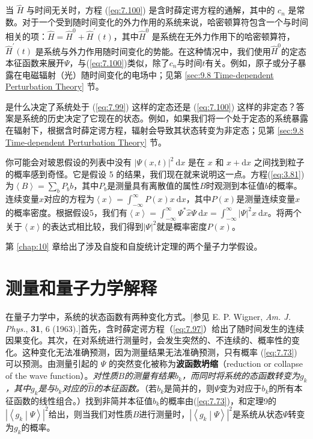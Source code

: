     当 $\hat{H}$ 与时间无关时，方程 (\ref{eq:7.100}) 是含时薛定谔方程的通解，其中的 $c_n$ 是常数。对于一个受到随时间变化的外力作用的系统来说，哈密顿算符包含一个与时间相关的项：$\hat{H} = \hat{H}^0 + \hat{H}^{\prime}\left(t\right)$，其中$\hat{H}^0$ 是系统在无外力作用下的哈密顿算符，$\hat{H}^{\prime}\left(t\right)$ 是系统与外力作用随时间变化的势能。在这种情况中，我们使用$\hat{H}^0$的定态本征函数来展开$\Psi$，与(\ref{eq:7.100})类似，除了$c_n$与时间$t$有关。例如，原子或分子暴露在电磁辐射（光）随时间变化的电场中；见第 \ref{sec:9.8 Time-dependent Perturbation Theory} 节。

    是什么决定了系统处于 (\ref{eq:7.99}) 这样的定态还是 (\ref{eq:7.100}) 这样的非定态？答案是系统的历史决定了它现在的状态。例如，如果我们将一个处于定态的系统暴露在辐射下，根据含时薛定谔方程，辐射会导致其状态转变为非定态；见第 \ref{sec:9.8 Time-dependent Perturbation Theory} 节。

    你可能会对玻恩假设的列表中没有 $\left|\Psi\left(x,t\right)\right|^2\:\mathrm{d}x$ 是在 $x$ 和 $x+\mathrm{d}x$ 之间找到粒子的概率感到奇怪。它是假设 5 的结果，我们现在就来说明这一点。方程(\ref{eq:3.81})为$\left\langle B \right\rangle = \sum_{b}P_bb$，其中$P_b$是测量具有离散值的属性$B$时观测到本征值$b$的概率。连续变量$x$对应的方程为$\left\langle x \right\rangle = \int_{-\infty}^{\infty}P\left(x\right)x\:\mathrm{d}x$，其中$P\left(x\right)$是测量连续变量$x$的概率密度。根据假设5，我们有$\left\langle x \right\rangle= \int_{-\infty}^{\infty}\Psi^{\ast}\hat{x}\Psi\:\mathrm{d}x = \int_{-\infty}^{\infty}\left|\Psi\right|^2x\:\mathrm{d}x$。将两个关于$\left\langle x \right\rangle$的表达式相比较，我们得到$\left|\Psi\right|^2$就是概率密度$P\left(x\right)$。

    第 \ref{chap:10} 章给出了涉及自旋和自旋统计定理的两个量子力学假设。

\section{测量和量子力学解释}
\label{sec:7.9 Measurement and the Interpretation of Quantum Mechanics}
    在量子力学中，系统的状态函数有两种变化方式。[参见 E. P. Wigner, \textit{Am. J. Phys.}, \textbf{31}, 6 (1963).]首先，含时薛定谔方程（\ref{eq:7.97}）给出了随时间发生的连续因果变化。其次，在对系统进行测量时，会发生突然的、不连续的、概率性的变化。这种变化无法准确预测，因为测量结果无法准确预测，只有概率 (\ref{eq:7.73}) 可以预测。由测量引起的 $\Psi$ 的突然变化被称为\textbf{波函数坍缩}（reduction or collapse of the wave function）。\textit{对性质$B$的测量有结果$b_k$，而同时将系统的态函数转变为$g_k$，其中$g_k$是与$b_k$对应的$\hat{B}$的本征函数。}（若$b_k$是简并的，则$\Psi$变为对应于$b_k$的所有本征函数的线性组合。）找到非简并本征值$b_k$的概率由(\ref{eq:7.73})，和定理9的$\left|\left\langle g_k \middle| \Psi \right\rangle\right|^2$给出，则当我们对性质$B$进行测量时，$\left|\left\langle g_k \middle| \Psi \right\rangle\right|^2$是系统从状态$\Psi$转变为$g_k$的概率。

